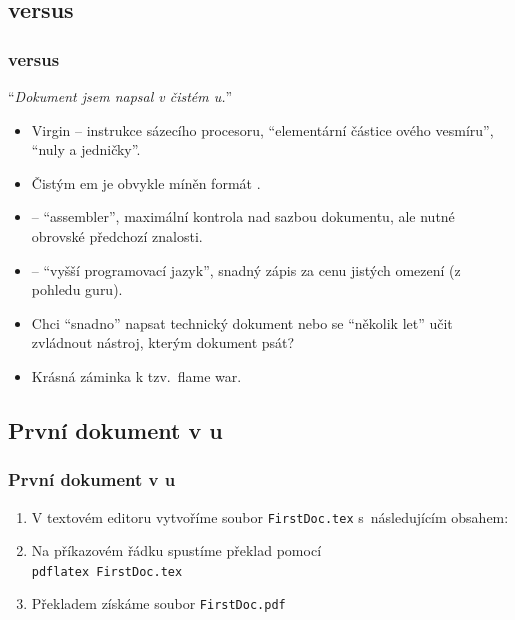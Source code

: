 \subsection{ versus }
\begin{frame}
	\frametitle{ versus }
	\enquote{\emph{Dokument jsem napsal v čistém u.}}
	\begin{itemize}
		\item Virgin  -- instrukce sázecího procesoru, \enquote{elementární částice ového vesmíru}, \enquote{nuly a jedničky}.
		\item Čistým em je obvykle míněn formát .
		\item {} -- \enquote{assembler}, maximální kontrola nad sazbou dokumentu, ale nutné obrovské předchozí znalosti.
		\item {} -- \enquote{vyšší programovací jazyk}, snadný zápis za cenu jistých omezení (z pohledu  guru).
		\item Chci \enquote{snadno} napsat technický dokument nebo se \enquote{několik let} učit zvládnout nástroj, kterým dokument psát?
		\item Krásná záminka k tzv.\ flame war.
	\end{itemize}
\end{frame}


\subsection{První dokument v u}
\begin{frame}
	\frametitle{První dokument v u}
	\begin{enumerate}
		\item V textovém editoru vytvoříme soubor \texttt{FirstDoc.tex} s~následujícím obsahem:\par
		\item Na příkazovém řádku spustíme překlad pomocí\\\texttt{pdflatex FirstDoc.tex}
		\item Překladem získáme soubor \texttt{FirstDoc.pdf}
	\end{enumerate}
\end{frame}


